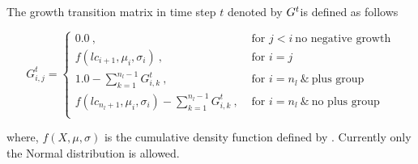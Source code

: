 The growth transition matrix in time step \(t\) denoted by \(\boldmath{G^t}\)is defined as follows

\begin{equation}
G^t_{i,j} = 
\begin{cases}
0.0 \ , & \text{ for } j < i \ \text{no negative growth}\\
f(lc_{i + 1},\mu_i, \sigma_i) \ , & \text{ for } i = j \\
1.0 - \sum\limits_{k = 1}^{n_l - 1}G^t_{i,k} \ , & \text{ for } i = n_l \ \& \ \text{plus group} \\
f(lc_{n_l + 1},\mu_i, \sigma_i) - \sum\limits_{k = 1}^{n_l - 1}G^t_{i,k} \ , & \text{ for } i = n_l \ \&  \  \text{no plus group} \\		
\end{cases}
\end{equation}

where, \(f(X,\mu, \sigma)\) is the cumulative density function defined by . Currently only the Normal distribution is allowed.
